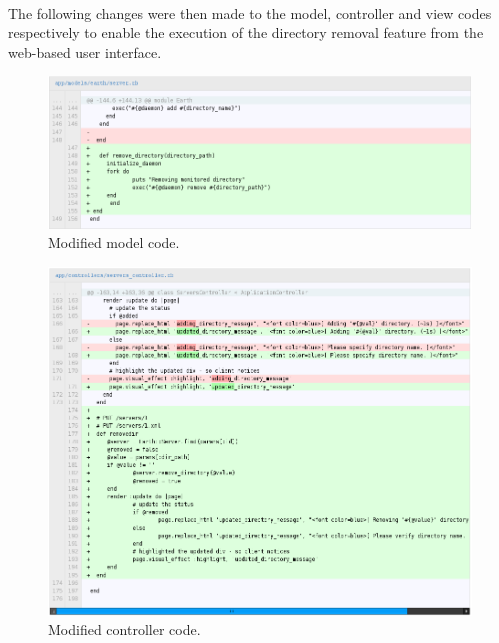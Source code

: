 \documentclass[10pt,a4,oneside]{article}
\begin{document}
\newpage

\paragraph{}
The following changes were then made to the model, controller and view 
codes respectively to enable the execution of the directory removal 
feature from the web-based user interface.


\begin{figure}[h!]
\begin{centering}
\includegraphics[width=150mm]{figs/earthmodel}
\end{centering}
\caption{Modified model code.}
\label{fig:earthmodel}
\end{figure}


\begin{figure}[h!]
\begin{centering}
\includegraphics[width=150mm]{figs/earthcontroller}
\end{centering}
\caption{Modified controller code.}
\label{fig:earthcontroller}
\end{figure}
\end{document}
